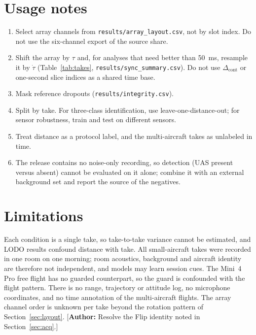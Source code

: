 \documentclass[journal]{IEEEtran}
\newif\ifshowauthornotes\showauthornotestrue
\newcommand{\authornote}[1]{\ifshowauthornotes{\color{red!70!black}[\textbf{Author:} #1]}\fi}
\begin{document}
\section{Usage notes}\label{sec:usage}
\begin{enumerate}
\item Select array channels from \texttt{results/array\_layout.csv}, not by slot index. Do not use the six-channel export of the source share.
\item Shift the array by $\tau$ and, for analyses that need better than \SI{50}{\milli\second}, resample it by $\dot\tau$ (Table~\ref{tab:takes}, \texttt{results/sync\_summary.csv}). Do not use $\Delta_\text{cont}$ or one-second slice indices as a shared time base.
\item Mask reference dropouts (\texttt{results/integrity.csv}).
\item Split by take. For three-class identification, use leave-one-distance-out; for sensor robustness, train and test on different sensors.
\item Treat distance as a protocol label, and the multi-aircraft takes as unlabeled in time.
\item The release contains no noise-only recording, so detection (UAS present versus absent) cannot be evaluated on it alone; combine it with an external background set and report the source of the negatives.
\end{enumerate}

\section{Limitations}
Each condition is a single take, so take-to-take variance cannot be estimated, and LODO results confound distance with take.
All small-aircraft takes were recorded in one room on one morning; room acoustics, background and aircraft identity are therefore not independent, and models may learn session cues.
The Mini~4 Pro free flight has no guarded counterpart, so the guard is confounded with the flight pattern.
There is no range, trajectory or attitude log, no microphone coordinates, and no time annotation of the multi-aircraft flights.
The array channel order is unknown per take beyond the rotation pattern of Section~\ref{sec:layout}.
\authornote{Resolve the Flip identity noted in Section~\ref{sec:acq}.}

\end{document}
